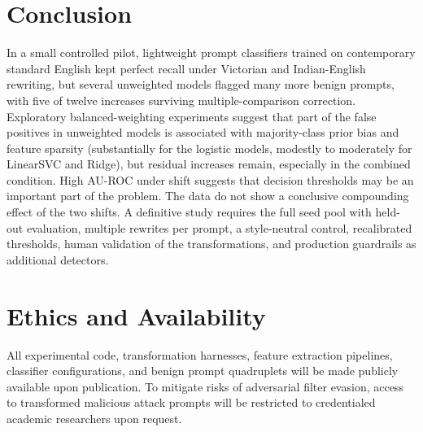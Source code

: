 \documentclass[conference]{IEEEtran}
\begin{document}
\section{Conclusion}
\label{sec:conclusion}
In a small controlled pilot, lightweight prompt classifiers trained on contemporary standard English kept perfect recall under Victorian and Indian-English rewriting, but several unweighted models flagged many more benign prompts, with five of twelve increases surviving multiple-comparison correction. Exploratory balanced-weighting experiments suggest that part of the false positives in unweighted models is associated with majority-class prior bias and feature sparsity (substantially for the logistic models, modestly to moderately for LinearSVC and Ridge), but residual increases remain, especially in the combined condition. High AU-ROC under shift suggests that decision thresholds may be an important part of the problem. The data do not show a conclusive compounding effect of the two shifts. A definitive study requires the full seed pool with held-out evaluation, multiple rewrites per prompt, a style-neutral control, recalibrated thresholds, human validation of the transformations, and production guardrails as additional detectors.

\section*{Ethics and Availability}
All experimental code, transformation harnesses, feature extraction pipelines, classifier configurations, and benign prompt quadruplets will be made publicly available upon publication. To mitigate risks of adversarial filter evasion, access to transformed malicious attack prompts will be restricted to credentialed academic researchers upon request.



\end{document}
